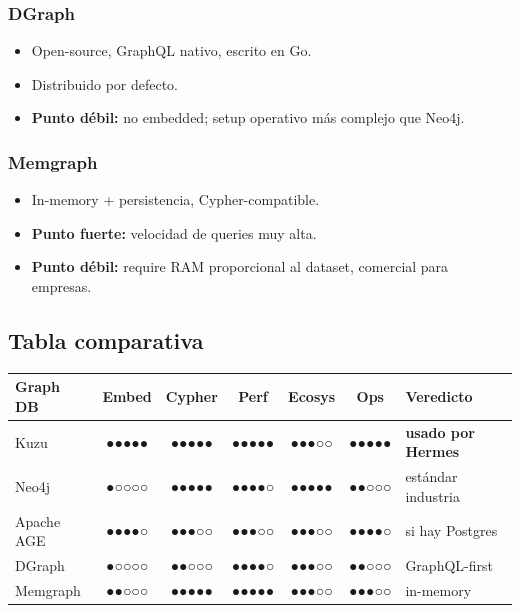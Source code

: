 \documentclass[11pt,a4paper]{article}
\newcommand{\scale}[1]{\textbf{\color{sotagreen}#1}}
\begin{document}
\subsubsection{DGraph}
\begin{itemize}[leftmargin=*,itemsep=0pt]
\item Open-source, GraphQL nativo, escrito en Go.
\item Distribuido por defecto.
\item \textbf{Punto débil:} no embedded; setup operativo más complejo que Neo4j.
\end{itemize}

\subsubsection{Memgraph}
\begin{itemize}[leftmargin=*,itemsep=0pt]
\item In-memory + persistencia, Cypher-compatible.
\item \textbf{Punto fuerte:} velocidad de queries muy alta.
\item \textbf{Punto débil:} require RAM proporcional al dataset, comercial para empresas.
\end{itemize}

\subsection{Tabla comparativa}

\begin{center}
\begin{tabularx}{0.95\textwidth}{|l|c|c|c|c|c|X|}
\hline
\rowcolor{sotared}\color{white}\textbf{Graph DB} & \color{white}\textbf{Embed} & \color{white}\textbf{Cypher} & \color{white}\textbf{Perf} & \color{white}\textbf{Ecosys} & \color{white}\textbf{Ops} & \color{white}\textbf{Veredicto}\\
\hline
\rowcolor{hermespos}Kuzu & \scale{●●●●●} & \scale{●●●●●} & \scale{●●●●●} & ●●●○○ & \scale{●●●●●} & \textbf{usado por Hermes}\\
Neo4j & ●○○○○ & \scale{●●●●●} & ●●●●○ & \scale{●●●●●} & ●●○○○ & estándar industria\\
Apache AGE & ●●●●○ & ●●●○○ & ●●●○○ & ●●●○○ & ●●●●○ & si hay Postgres\\
DGraph & ●○○○○ & ●●○○○ & ●●●●○ & ●●●○○ & ●●○○○ & GraphQL-first\\
Memgraph & ●●○○○ & \scale{●●●●●} & \scale{●●●●●} & ●●●○○ & ●●●○○ & in-memory\\
\hline
\end{tabularx}
\end{center}
\end{document}
